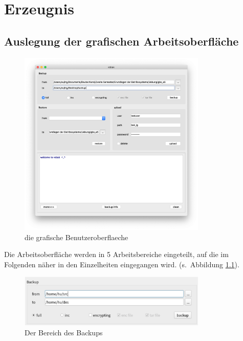 \chapter{Erzeugnis}
\section{Auslegung der grafischen Arbeitsoberfläche}

\begin{figure}[h!]
	\centering
	\includegraphics[width=0.8\textwidth]{bilder/vsbak_ui.png}
	\caption{die grafische Benutzeroberflaeche  }
	\label{Abbildung_3}
\end{figure}

Die Arbeitsoberfläche werden in 5 Arbeitsbereiche eingeteilt, auf die im Folgenden näher in den Einzelheiten eingegangen wird. (s. Abbildung \ref{Abbildung_3}). 

\begin{figure}[h!]
	\centering
	\includegraphics[width=0.8\textwidth]{bilder/backup.png}
	\caption{Der Bereich des Backups  }
	\label{Abbildung_4}
\end{figure}

